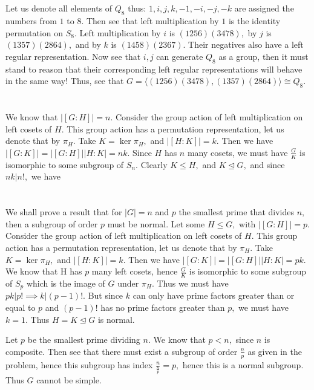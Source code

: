 \documentclass{article}
\begin{document}
\section{} %
Let us denote all elements of $Q_8$ thus: $1,i,j,k,-1,-i,-j,-k$ are assigned the numbers from $1$ to $8.$ 
Then see that left multiplication by $1$ is the identity permutation on $S_8.$ Left multiplication by $i$ is $(1 2 5 6)(3 4 7 8),$ by $j$ is $(1 3 5 7)(2 8 
6 4),$ and by $k$ is $(1 4 5 8)(2 3 6 7).$ Their negatives also have a left regular representation. Now see that $i,j$ can generate $Q_8$ as a group, then 
it must stand to reason that their corresponding left regular representations will behave in the same way! Thus, see that $G=\langle (1 2 5 6)(3 4 7 8), (1 
3 5 7)(2 8 6 4) \rangle \cong Q_8.$
\section{} %
We know that $|[G:H]| = n.$ Consider the group action of left multiplication on left cosets of $H.$ This group action has a permutation 
representation, let us denote that by $\pi_H.$ Take $K=\ker \pi_H,$ and $|[H:K]| =k.$ Then we have $|[G:K]|=|[G:H]||H:K|=nk.$ 
Since $H$ has $n$ many cosets, we must have $\frac{G}{K}$ is isomorphic to some subgroup of $S_n.$ Clearly $K \leq H,$ and $K \trianglelefteq G,$ and since 
$nk | n!,$ we have 
\section{} %
We shall prove a result that for $|G| =n$ and $p$ the smallest prime that divides $n,$ then a subgroup of order $p$ must be normal.
Let some $H \leq G,$ with $|[G:H]|=p.$ Consider the group action of left multiplication on left cosets of $H.$ This group action has a permutation 
representation, let us denote that by $\pi_H.$ Take $K=\ker \pi_H,$ and $|[H:K]| =k.$ 
Then we have $|[G:K]|=|[G:H]||H:K|=pk.$ We know that H has $p$ many left cosets, hence $\frac{G}{K}$ is isomorphic to some subgroup of $S_p$ which is the 
image of $G$ under $ \pi_H.$ Thus we must have $pk|p! \implies k|(p-1)!.$ But since $k$ can only have prime factors greater than or equal to $p$ and 
$(p-1)!$ has no prime factors greater than $p,$ we must have $k=1.$ Thus $H=K \trianglelefteq G$ is normal.
 
Let $p$ be the smallest prime dividing $n.$ We know that $p < n,$ since $n$ is composite. Then see that there must exist a subgroup of order $\frac{n}{p}$ 
as given in the problem, hence this subgroup has index $\frac{n}{\frac{n}{p}}=p,$ hence this is a normal subgroup. Thus $G$ cannot be simple. 
\end{document}
